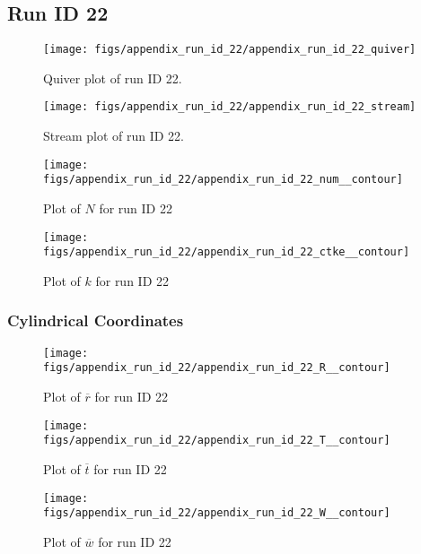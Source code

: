 \subsection{Run ID 22}
\begin{figure}[H]
\centering
\texttt{[image: figs/appendix\_run\_id\_22/appendix\_run\_id\_22\_quiver]}
\caption{Quiver plot of run ID 22.}
\label{fig:appendix_run_id_22_quiver}
\end{figure}


\begin{figure}[H]
\centering
\texttt{[image: figs/appendix\_run\_id\_22/appendix\_run\_id\_22\_stream]}
\caption{Stream plot of run ID 22.}
\label{fig:appendix_run_id_22_stream}
\end{figure}


\begin{figure}[H]
\centering
\texttt{[image: figs/appendix\_run\_id\_22/appendix\_run\_id\_22\_num\_\_contour]}
\caption{Plot of $N$ for run ID 22}
\label{fig:appendix_run_id_22_num__contour}
\end{figure}


\begin{figure}[H]
\centering
\texttt{[image: figs/appendix\_run\_id\_22/appendix\_run\_id\_22\_ctke\_\_contour]}
\caption{Plot of $k$ for run ID 22}
\label{fig:appendix_run_id_22_ctke__contour}
\end{figure}


\subsubsection{Cylindrical Coordinates}
\begin{figure}[H]
\centering
\texttt{[image: figs/appendix\_run\_id\_22/appendix\_run\_id\_22\_R\_\_contour]}
\caption{Plot of $\overline{r}$ for run ID 22}
\label{fig:appendix_run_id_22_R__contour}
\end{figure}


\begin{figure}[H]
\centering
\texttt{[image: figs/appendix\_run\_id\_22/appendix\_run\_id\_22\_T\_\_contour]}
\caption{Plot of $\overline{t}$ for run ID 22}
\label{fig:appendix_run_id_22_T__contour}
\end{figure}


\begin{figure}[H]
\centering
\texttt{[image: figs/appendix\_run\_id\_22/appendix\_run\_id\_22\_W\_\_contour]}
\caption{Plot of $\overline{w}$ for run ID 22}
\label{fig:appendix_run_id_22_W__contour}
\end{figure}


